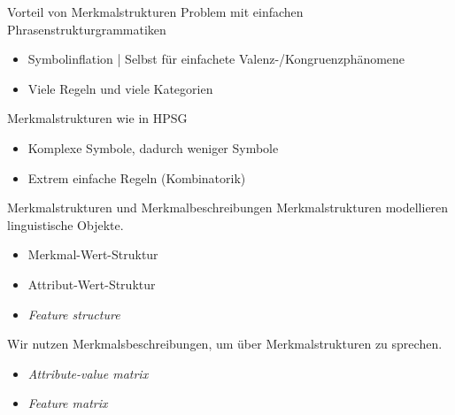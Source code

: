 \begin{frame}
  {Vorteil von Merkmalstrukturen}
  \onslide<+->
  \onslide<+->
  Problem mit einfachen \alert{Phrasenstrukturgrammatiken}\\
  \Halbzeile
  \begin{itemize}[<+->]
    \item \alert{Symbolinflation} | Selbst für einfachete Valenz-\slash Kongruenzphänomene
    \item Viele Regeln und viele Kategorien
  \end{itemize}
  \onslide<+->
  \Zeile
  \alert{Merkmalstrukturen} wie in HPSG\\
  \Halbzeile
  \begin{itemize}[<+->]
    \item \alert{Komplexe Symbole}, dadurch weniger Symbole
    \item Extrem einfache \alert{Regeln} (Kombinatorik)
  \end{itemize}
\end{frame}

\begin{frame}
  {Merkmalstrukturen und Merkmalbeschreibungen}
  \onslide<+->
  \onslide<+->
  \alert{Merkmalstrukturen} modellieren linguistische Objekte.\\
  \Halbzeile
  \begin{itemize}[<+->]
    \item Merkmal-Wert-Struktur
    \item Attribut-Wert-Struktur
    \item \emph{Feature structure}
  \end{itemize}
  \onslide<+->
  \Zeile
  Wir nutzen \alert{Merkmalsbeschreibungen}, um über Merkmalstrukturen zu sprechen.\\
  \Halbzeile
  \begin{itemize}[<+->]
    \item \emph{Attribute-value matrix}
    \item \emph{Feature matrix}
  \end{itemize}
  \onslide<+->
  \Zeile
  \centering 
\end{frame}

